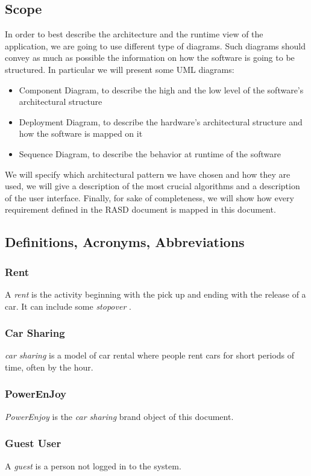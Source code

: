 \documentclass[english]{article}
\newcommand{\rent}{\textit{rent }}
\newcommand{\carsharing}{\textit {car sharing }}
\newcommand{\powerenjoy}{\textit{PowerEnjoy }}
\newcommand{\stopover}{\textit{stopover }}
\newcommand{\guest}{\textit{guest }}
\begin{document}
	\subsection{Scope}
		In order to best describe the architecture and the runtime view of the application, we are going to use different type of diagrams. Such diagrams should convey as much as possible the information on how the software is going to be structured.
		In particular we will present some UML diagrams:
			\begin{itemize}
				\item{Component Diagram, to describe the high and the low level of the software's architectural structure}
				\item{Deployment Diagram, to describe the hardware's architectural structure and how the software is mapped on it}
				\item{Sequence Diagram, to describe the behavior at runtime of the software}
			\end{itemize}
		 We will specify which architectural pattern we have chosen and how they are used, we will give a description of the most crucial algorithms and a description of the user interface. Finally, for sake of completeness, we will show how every requirement defined in the RASD document is mapped in this document.
	\subsection{Definitions, Acronyms, Abbreviations}
		\subsubsection{Rent}
			A \rent is the activity beginning with the pick up and ending with the release of a car. It can include some \stopover.
		\subsubsection{Car Sharing}
			\carsharing is a model of car rental where people rent cars for short periods of time, often by the hour.
		\subsubsection{PowerEnJoy}
			\powerenjoy is the \carsharing brand object of this document.
		\subsubsection{Guest User}
			A \guest is a person not logged in to the system.
\end{document}
